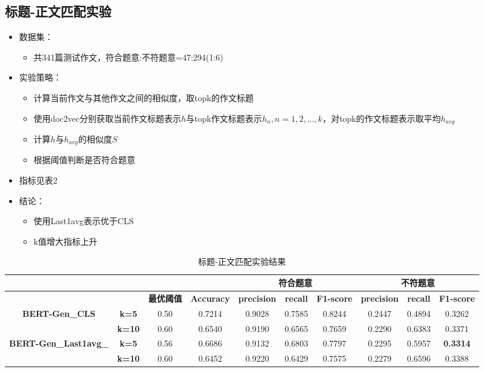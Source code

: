 \documentclass[11pt]{article}
\begin{document}
\begin{CJK}{UTF8}{gkai}
\subsection{标题-正文匹配实验}
\begin{itemize}
  \item 数据集：
  \begin{itemize}
    \item 共341篇测试作文，符合题意:不符题意=47:294(1:6)
  \end{itemize}
  \item 实验策略：
  \begin{itemize}
    \item 计算当前作文与其他作文之间的相似度，取topk的作文标题
    \item 使用doc2vec分别获取当前作文标题表示$h$与topk作文标题表示$h_n, n=1,2,...,k$，对topk的作文标题表示取平均$h_{avg}$
    \item 计算$h$与$h_{avg}$的相似度$S$
    \item 根据阈值判断是否符合题意
  \end{itemize}
  \item 指标见表2
  \item 结论：
  \begin{itemize}
    \item 使用Last1avg表示优于CLS
    \item k值增大指标上升
  \end{itemize}
\end{itemize}

\begin{table}[htbp]\small
  \centering
  \begin{tabular}{c|c|c|c|ccc|ccc}
    \hline
    \multicolumn{2}{c}{} &       &       & \multicolumn{3}{c}{\textbf{符合题意}} & \multicolumn{3}{c}{\textbf{不符题意}} \\
    \hline
    \multicolumn{2}{c}{} & \textbf{最优阈值} & \textbf{Accuracy} & \textbf{precision} & \textbf{recall} & \textbf{F1-score} & \textbf{precision} & \textbf{recall} & \textbf{F1-score} \\
    \hline
    \multirow{2}[0]{*}{\textbf{BERT-Gen\_CLS}} & \textbf{k=5} & 0.50  & 0.7214  & 0.9028  & 0.7585  & 0.8244  & 0.2447  & 0.4894  & 0.3262  \\
    & \textbf{k=10} & 0.60  & 0.6540  & 0.9190  & 0.6565  & 0.7659  & 0.2290  & 0.6383  & 0.3371  \\
    \hline
    \multirow{2}[0]{*}{\textbf{BERT-Gen\_Last1avg\_}} & \textbf{k=5} & 0.56  & 0.6686  & 0.9132  & 0.6803  & 0.7797  & 0.2295  & 0.5957  & \textcolor[rgb]{ 1,  0,  0}{\textbf{0.3314 }} \\
    & \textbf{k=10} & 0.60  & 0.6452  & 0.9220  & 0.6429  & 0.7575  & 0.2279  & 0.6596  & 0.3388  \\
    \hline
  \end{tabular}%
  \caption{标题-正文匹配实验结果}
  \label{tab:addlabel}%
\end{table}%



\end{CJK}
\end{document}
